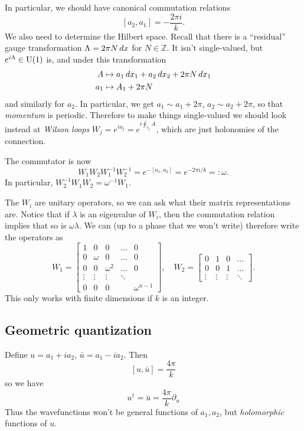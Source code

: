 In particular, we should have canonical commutation relations
\[
[a_2, a_1] = - \frac{2 \pi i}{k}.
\]
We also need to determine the Hilbert space.
Recall that there is a ``residual'' gauge transformation $\Lambda = 2 \pi N \, d x$ for $N \in \mathbb Z$.
It isn't single-valued, but $e^{i \Lambda} \in \operatorname{U}(1)$ is, and under this transformation
\begin{align*}
A &\mapsto a_1 \, d x_1 + a_2 \, d x_2 + 2 \pi N \, d x_1\\
a_1 &\mapsto A_1 + 2 \pi N
\end{align*}
and similarly for $a_2$.
In particular, we get $a_1 \sim a_1 + 2 \pi$, $a_2 \sim a_2 + 2 \pi$, so that \emph{momentum} is periodic.
Therefore to make things single-valued we should look instead at \emph{Wilson loops} $W_j = e^{i a_j} = e^{i \oint_{c_j} A}$, which are just holonomies of the connection.

The commutator is now
\[
W_1 W_2 W_1^{-1} W_2^{-1} = e^{-[a_1,a_2]} = e^{-2 \pi i /k} =: \omega.
\]
In particular, $W_2^{-1} W_1 W_2 = \omega^{-1} W_1$.

The $W_i$ are unitary operators, so we can ask what their matrix representations are.
Notice that if $\lambda$ is an eigenvalue of $W_i$, then the commutation relation implies that so is $\omega \lambda$.
We can (up to a phase that we won't write) therefore write the operators as
\[ W_1 = 
\begin{bmatrix}
1 & 0 &0 & \dots & 0\\
0 & \omega & 0 & \dots & 0\\
0 & 0 & \omega^2 & \dots & 0\\
\vdots & \vdots & \vdots & \ddots\\
0 & 0 & 0 &  & \omega^{n-1}
\end{bmatrix}, \quad
W_2 =
\begin{bmatrix}
0 & 1 & 0 & \dots\\
0 & 0 & 1 & \dots\\
\vdots & \vdots & \vdots & \ddots
\end{bmatrix}.
\]
This only works with finite dimensions if $k$ is an integer.

\subsection*{Geometric quantization}
Define $u = a_1 + ia_2$, $\bar u = a_1 -ia_2$.
Then
\[
[u,\bar u] = \frac{4 \pi}{k}
\]
so we have
\[
u^\dagger = \bar u = \frac{4 \pi}{k} \partial_u
\]
Thus the wavefunctions won't be general functions of $a_1, a_2$, but \emph{holomorphic} functions of $u$.

